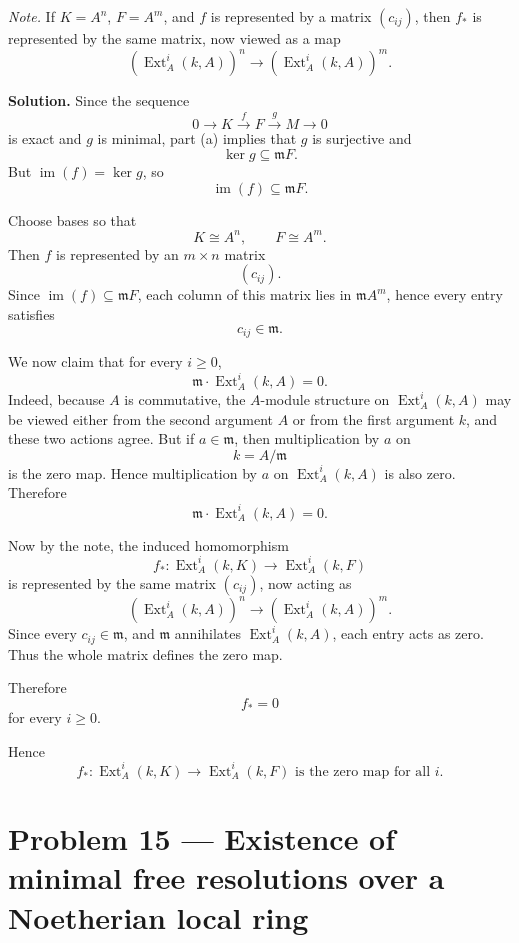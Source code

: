 \documentclass[12pt,a4paper]{article}
\theoremstyle{plain}
\theoremstyle{definition}      %
\begin{document}
\medskip

\textit{Note.} If \(K=A^n\), \(F=A^m\), and \(f\) is represented by a matrix \((c_{ij})\), then \(f_*\) is represented by the same matrix, now viewed as a map
\[
(\operatorname{Ext}_A^i(k,A))^n\to (\operatorname{Ext}_A^i(k,A))^m.
\]

\textbf{Solution.}
Since the sequence
\[
0\to K \xrightarrow{f} F \xrightarrow{g} M \to 0
\]
is exact and \(g\) is minimal, part (a) implies that \(g\) is surjective and
\[
\ker g\subseteq \mathfrak m F.
\]
But \(\operatorname{im}(f)=\ker g\), so
\[
\operatorname{im}(f)\subseteq \mathfrak m F.
\]

Choose bases so that
\[
K\cong A^n,\qquad F\cong A^m.
\]
Then \(f\) is represented by an \(m\times n\) matrix
\[
(c_{ij}).
\]
Since \(\operatorname{im}(f)\subseteq \mathfrak m F\), each column of this matrix lies in \(\mathfrak m A^m\), hence every entry satisfies
\[
c_{ij}\in \mathfrak m.
\]

We now claim that for every \(i\ge 0\),
\[
\mathfrak m\cdot \operatorname{Ext}_A^i(k,A)=0.
\]
Indeed, because \(A\) is commutative, the \(A\)-module structure on \(\operatorname{Ext}_A^i(k,A)\) may be viewed either from the second argument \(A\) or from the first argument \(k\), and these two actions agree. But if \(a\in \mathfrak m\), then multiplication by \(a\) on
\[
k=A/\mathfrak m
\]
is the zero map. Hence multiplication by \(a\) on \(\operatorname{Ext}_A^i(k,A)\) is also zero. Therefore
\[
\mathfrak m\cdot \operatorname{Ext}_A^i(k,A)=0.
\]

Now by the note, the induced homomorphism
\[
f_*:\operatorname{Ext}_A^i(k,K)\to \operatorname{Ext}_A^i(k,F)
\]
is represented by the same matrix \((c_{ij})\), now acting as
\[
(\operatorname{Ext}_A^i(k,A))^n\to (\operatorname{Ext}_A^i(k,A))^m.
\]
Since every \(c_{ij}\in \mathfrak m\), and \(\mathfrak m\) annihilates \(\operatorname{Ext}_A^i(k,A)\), each entry acts as zero. Thus the whole matrix defines the zero map.

Therefore
\[
f_*=0
\]
for every \(i\ge 0\).

\medskip

Hence
\[
\boxed{
	f_*:\operatorname{Ext}_A^i(k,K)\longrightarrow \operatorname{Ext}_A^i(k,F)
	\text{ is the zero map for all }i.
}
\]	

\section*{Problem 15 --- Existence of minimal free resolutions over a Noetherian local ring}
\end{document}
